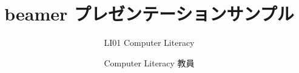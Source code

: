 \documentclass[platex,a4paper,12pt,dvipdfmx,aspectratio=169]{beamer}
\title{beamer プレゼンテーションサンプル}
\subtitle{LI01 Computer Literacy}
\author{Computer Literacy 教員}
\institute{会津大学}
\begin{document}
\frame{
\titlepage
}
\end{document}
